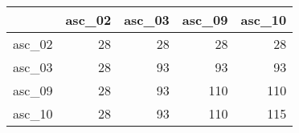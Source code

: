\begin{tabular}{lrrrr}
\toprule
{} &  asc\_02 &  asc\_03 &  asc\_09 &  asc\_10 \\
\midrule
asc\_02 &      28 &      28 &      28 &      28 \\
asc\_03 &      28 &      93 &      93 &      93 \\
asc\_09 &      28 &      93 &     110 &     110 \\
asc\_10 &      28 &      93 &     110 &     115 \\
\bottomrule
\end{tabular}
